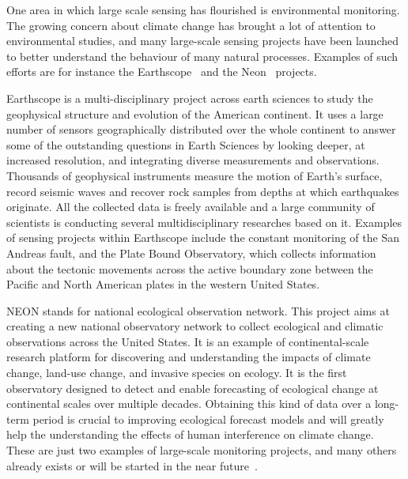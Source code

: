 One area in which large scale sensing has flourished is environmental monitoring. The growing concern
about climate change has brought a lot of attention to environmental studies, and many large-scale
sensing projects have been launched to better understand the behaviour of many natural processes.
Examples of such efforts are for instance the Earthscope~\cite{earthscope} and the Neon~\cite{neon}
projects.

Earthscope is a multi-disciplinary project across earth sciences to study the geophysical structure and
evolution of the American continent. It uses a large number of sensors geographically distributed over
the whole continent to answer some of the outstanding questions in Earth Sciences by looking deeper, at
increased resolution, and integrating diverse measurements and observations. Thousands of geophysical
instruments measure the motion of Earth's surface, record seismic waves and recover rock samples from
depths at which earthquakes originate. All the collected data is freely available and a large community
of scientists is conducting several multidisciplinary researches based on it. Examples of sensing
projects within Earthscope include the constant monitoring of the San Andreas fault, and the Plate Bound
Observatory, which collects information about the tectonic movements across the active boundary zone
between the Pacific and North American plates in the western United States.

NEON stands for national ecological observation network. This project aims at creating a new national
observatory network to collect ecological and climatic observations across the United States. It is an
example of continental-scale research platform for discovering and understanding the impacts of climate
change, land-use change, and invasive species on ecology. It is the first observatory designed to detect
and enable forecasting of ecological change at continental scales over multiple decades. Obtaining this
kind of data over a \mbox{long-term} period is crucial to improving ecological forecast models and will
greatly help the understanding the effects of human interference on climate change.  These are just two
examples of large-scale monitoring projects, and many others already exists or will be started in the
near future~\cite{testban,skysurvey,neon,usvo}. 

